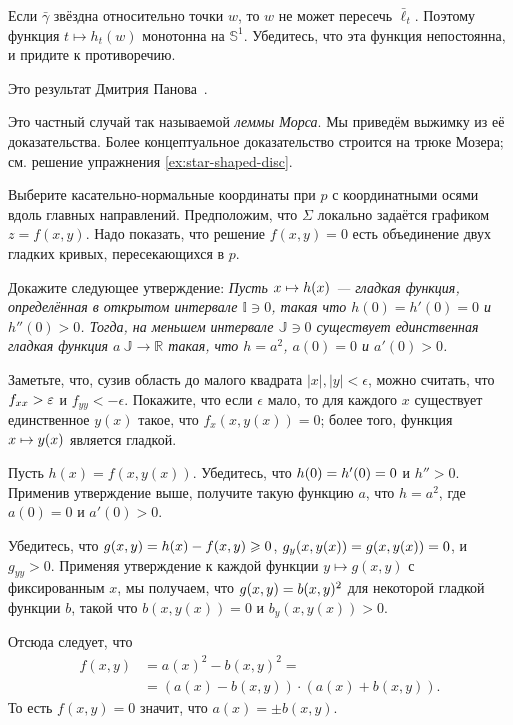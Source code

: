 \begin{multicols}{2}
Если $\bar\gamma$ звёздна относительно точки $w$, то $w$ не может пересечь $\bar\ell_t$.
Поэтому функция $t\mapsto h_t(w)$ монотонна на $\mathbb{S}^1$.
Убедитесь, что эта функция непостоянна, и придите к противоречию.

Это результат Дмитрия Панова~\cite{panov-curves}.

Это частный случай так называемой \emph{леммы Морса}.
Мы приведём выжимку из её доказательства.
Более концептуальное доказательство \cite{abraham-marsden-ratiu} строится на трюке Мозера; см. решение упражнения \ref{ex:star-shaped-disc}.

\medskip

Выберите касательно-нормальные координаты при $p$ с координатными осями вдоль главных направлений.
Предположим, что $\Sigma$ локально задаётся графиком $z=f(x,y)$.
Надо показать, что решение $f(x,y)=0$ есть объединение двух гладких кривых, пересекающихся в $p$.

Докажите следующее утверждение:
\textit{Пусть $x\z\mapsto h(x)$ --- гладкая функция, определённая в открытом интервале $\mathbb{I}\ni0$, такая что $h(0)=h'(0)=0$ и $h''(0)>0$.
Тогда, на меньшем интервале $\mathbb{J}\ni0$ существует единственная гладкая функция $a\:\mathbb{J}\to\mathbb{R}$ такая, что $h=a^2$, $a(0)=0$ и $a'(0)> 0$.}

Заметьте, что, сузив область до малого квадрата  $|x|,|y|<\epsilon$, можно считать, что $f_{xx}\z>\epsilon$ и $f_{yy}<-\epsilon$.
Покажите, что если $\epsilon$ мало, то для каждого $x$ существует единственное $y(x)$ такое, что $f_x(x,y(x))=0$; более того, функция $x\z\mapsto y(x)$ является гладкой.

Пусть $h(x)=f(x,y(x))$.
Убедитесь, что $h(0)\z=h'(0)=0$ и $h''>0$.
Применив утверждение выше, получите такую функцию $a$, что $h=a^2$, где $a(0)=0$ и $a'(0)>0$.

Убедитесь, что $g(x,y)=h(x)-f(x,y)\z\ge 0$, $g_y(x,y(x))\z=g(x,y(x))\z=0$, и $g_{yy}>0$.
Применяя утверждение к каждой функции $y\mapsto g(x,y)$ с фиксированным $x$, мы получаем, что $g(x,y)\z=b(x,y)^2$ для некоторой гладкой функции $b$, такой что
$b(x,y(x))=0$ и $b_y(x,y(x))>0$.

Отсюда следует, что 
\begin{align*}
f(x,y)&=a(x)^2-b(x,y)^2=
\\
&=
(a(x)-b(x,y))\cdot (a(x)+b(x,y)).
\end{align*}
То есть $f(x,y)=0$ значит, что $a(x)=\pm b(x,y)$.


\end{multicols}
